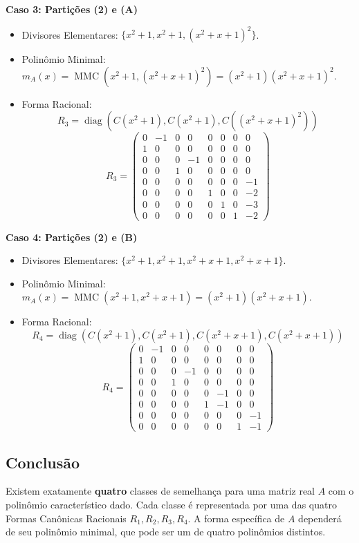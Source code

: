 \textbf{Caso 3: Partições (2) e (A)}
\begin{itemize}
\item Divisores Elementares: $\{x^2+1,x^2+1,(x^2+x+1)^2\}$.
\item Polinômio Minimal: $m_A(x)=\operatorname{MMC}(x^2+1,(x^2+x+1)^2)=(x^2+1)(x^2+x+1)^2$.
\item Forma Racional:
\[
R_3=\operatorname{diag}(C(x^2+1),C(x^2+1),C((x^2+x+1)^2))
\]
\[
R_3=\begin{pmatrix}
0&-1&0&0&0&0&0&0\\
1&0&0&0&0&0&0&0\\
0&0&0&-1&0&0&0&0\\
0&0&1&0&0&0&0&0\\
0&0&0&0&0&0&0&-1\\
0&0&0&0&1&0&0&-2\\
0&0&0&0&0&1&0&-3\\
0&0&0&0&0&0&1&-2
\end{pmatrix}
\]
\end{itemize}

\textbf{Caso 4: Partições (2) e (B)}
\begin{itemize}
\item Divisores Elementares: $\{x^2+1,x^2+1,x^2+x+1,x^2+x+1\}$.
\item Polinômio Minimal: $m_A(x)=\operatorname{MMC}(x^2+1,x^2+x+1)=(x^2+1)(x^2+x+1)$.
\item Forma Racional:
\[
R_4=\operatorname{diag}(C(x^2+1),C(x^2+1),C(x^2+x+1),C(x^2+x+1))
\]
\[
R_4=\begin{pmatrix}
0&-1&0&0&0&0&0&0\\
1&0&0&0&0&0&0&0\\
0&0&0&-1&0&0&0&0\\
0&0&1&0&0&0&0&0\\
0&0&0&0&0&-1&0&0\\
0&0&0&0&1&-1&0&0\\
0&0&0&0&0&0&0&-1\\
0&0&0&0&0&0&1&-1
\end{pmatrix}
\]
\end{itemize}

\subsection*{Conclusão}

Existem exatamente \textbf{quatro} classes de semelhança para uma matriz real $A$ com o polinômio característico dado. Cada classe é representada por uma das quatro Formas Canônicas Racionais $R_1,R_2,R_3,R_4$.  
A forma específica de $A$ dependerá de seu polinômio minimal, que pode ser um de quatro polinômios distintos.